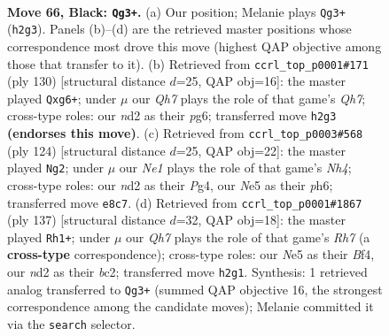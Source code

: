 \documentclass[11pt]{article}
\begin{document}
\clearpage

\begin{figure}[p]\centering
\begin{subfigure}{0.46\textwidth}\centering
\resizebox{\linewidth}{!}{%
\newchessgame
\chessboard[
  setfen={3kn3/1Q6/P7/4n1K1/8/8/3N3q/8 b - - 4 66},
  showmover=false,
  pgfstyle=straightmove, color=movearrow, markmove={h2-g3}
]}
\caption{}
\end{subfigure}\hfill
\begin{subfigure}{0.46\textwidth}\centering
\resizebox{\linewidth}{!}{%
\newchessgame
\chessboard[
  setfen={3q4/7Q/4k1p1/8/6N1/3P2K1/8/8 w - - 16 66},
  showmover=false,
  pgfstyle=straightmove, color=movearrow, markmove={h7-g6}
]}
\caption{}
\end{subfigure}
\\[4pt]
\begin{subfigure}{0.46\textwidth}\centering
\resizebox{\linewidth}{!}{%
\newchessgame
\chessboard[
  setfen={1Q3nk1/8/7p/8/6PN/6K1/4q3/8 w - - 5 63},
  showmover=false,
  pgfstyle=straightmove, color=movearrow, markmove={h4-g2}
]}
\caption{}
\end{subfigure}\hfill
\begin{subfigure}{0.46\textwidth}\centering
\resizebox{\linewidth}{!}{%
\newchessgame
\chessboard[
  setfen={8/5nk1/8/2Q5/5b2/5P2/2B4r/5K2 b - - 6 69},
  showmover=false,
  pgfstyle=straightmove, color=movearrow, markmove={h2-h1}
]}
\caption{}
\end{subfigure}
\caption{\textbf{Move 66, Black: \texttt{Qg3+}.} (a) Our position; Melanie plays \texttt{Qg3+} (\texttt{h2g3}). Panels (b)--(d) are the retrieved master positions whose correspondence most drove this move (highest QAP objective among those that transfer to it). (b) Retrieved from \texttt{ccrl\_top\_p0001\#171} (ply 130) [structural distance $d$=25, QAP obj=16]: the master played \texttt{Qxg6+}; under $\mu$ our \emph{Qh7} plays the role of that game's \emph{Qh7}; cross-type roles: our \emph{n}d2 as their \emph{p}g6; transferred move \texttt{h2g3} \textbf{(endorses this move)}. (c) Retrieved from \texttt{ccrl\_top\_p0003\#568} (ply 124) [structural distance $d$=25, QAP obj=22]: the master played \texttt{Ng2}; under $\mu$ our \emph{Ne1} plays the role of that game's \emph{Nh4}; cross-type roles: our \emph{n}d2 as their \emph{P}g4, our \emph{N}e5 as their \emph{p}h6; transferred move \texttt{e8c7}. (d) Retrieved from \texttt{ccrl\_top\_p0001\#1867} (ply 137) [structural distance $d$=32, QAP obj=18]: the master played \texttt{Rh1+}; under $\mu$ our \emph{Qh7} plays the role of that game's \emph{Rh7} (a \textbf{cross-type} correspondence); cross-type roles: our \emph{N}e5 as their \emph{B}f4, our \emph{n}d2 as their \emph{b}c2; transferred move \texttt{h2g1}. Synthesis: 1 retrieved analog transferred to \texttt{Qg3+} (summed QAP objective 16, the strongest correspondence among the candidate moves); Melanie committed it via the \texttt{search} selector.}
\label{fig:thought-m131}
\end{figure}
\end{document}
